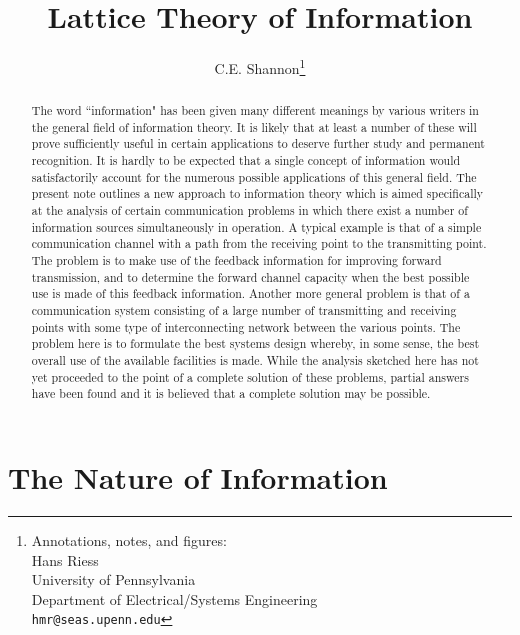 \documentclass{article}[10pt, letter]
\title{Lattice Theory of Information}
\author{C.E. Shannon\thanks{Annotations, notes, and figures: \\ Hans Riess \\ University of Pennsylvania \\Department of Electrical/Systems Engineering \\ \texttt{hmr@seas.upenn.edu}}}
\date{}
\begin{document}
\maketitle

\begin{abstract}
	The word ``information" has been given many different meanings by various writers in the general field of information theory. It is likely that at
	least a number of these will prove sufficiently useful in certain applications to deserve further study and permanent recognition. It is hardly to be
	expected that a single concept of information would satisfactorily account for the numerous possible applications of this general field. The present note outlines a new approach to information theory which is aimed specifically at the analysis of certain communication problems in which there exist a number of information sources simultaneously in operation. A typical example is that 	of a simple communication channel with a path from the receiving point to the transmitting point. The problem is to make use of the feedback information for improving forward transmission, and to determine the forward channel capacity when the best possible use is made of this feedback information. Another more general problem is that of a communication system consisting of a large number of transmitting and receiving points with some type of interconnecting network between the various points. The problem here is to formulate the best systems design whereby, in some sense, the best overall use of the available facilities is made. While the analysis sketched	here has not yet proceeded to the point of a complete solution of these	problems, partial answers have been found and it is believed that a complete	solution may be possible.
\end{abstract}

\section{The Nature of Information}
\end{document}
